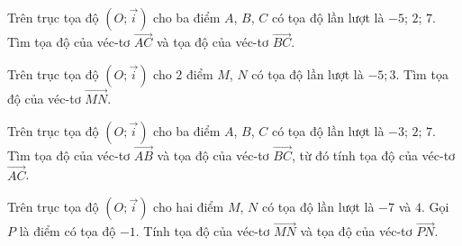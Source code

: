 \begin{bt}%
	Trên trục tọa độ $\left(O;\overrightarrow{i}\right)$ cho ba điểm $A$, $B$, $C$ có tọa độ lần lượt là $-5$; $2$; $7$. Tìm tọa độ của véc-tơ $\overrightarrow{AC}$ và tọa độ của véc-tơ $\overrightarrow{BC}$.
\end{bt}

\begin{bt}%
Trên trục tọa độ $\left(O;\overrightarrow{i}\right)$ cho 2 điểm $M$, $N$ có tọa độ lần lượt là $-5; 3$. Tìm tọa độ của véc-tơ $\overrightarrow{MN}$.
\end{bt}

\begin{bt}%
	Trên trục tọa độ $\left(O;\overrightarrow{i}\right)$ cho ba điểm $A$, $B$, $C$ có tọa độ lần lượt là $-3;\, 2;\, 7$. Tìm tọa độ của véc-tơ $\overrightarrow{AB}$ và tọa độ của véc-tơ $\overrightarrow{BC}$, từ đó tính tọa độ của véc-tơ $\overrightarrow{AC}$.
\end{bt}

\begin{bt}%
Trên trục tọa độ $\left(O;\overrightarrow{i}\right)$ cho hai điểm $M$, $N$ có tọa độ lần lượt là $-7$ và $4$. Gọi $P$ là điểm có tọa độ $-1$. Tính tọa độ của véc-tơ $\overrightarrow{MN}$ và tọa độ của véc-tơ $\overrightarrow{PN}$.
\end{bt}

